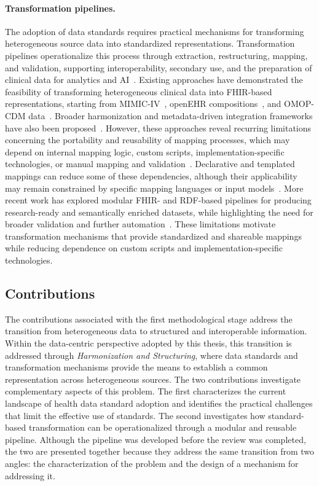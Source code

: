 \paragraph{Transformation pipelines.}
The adoption of data standards requires practical mechanisms for transforming heterogeneous source data into standardized representations. Transformation pipelines operationalize this process through extraction, restructuring, mapping, and validation, supporting interoperability, secondary use, and the preparation of clinical data for analytics and AI~\cite{namli2024scalable,tabari2022state}. Existing approaches have demonstrated the feasibility of transforming heterogeneous clinical data into FHIR-based representations, starting from MIMIC-IV~\cite{bennett2023mimic}, openEHR compositions~\cite{ladas2022openehr}, and OMOP-CDM data~\cite{soares2023omop}. Broader harmonization and metadata-driven integration frameworks have also been proposed~\cite{williams2023standardized,simon2024metadata}. However, these approaches reveal recurring limitations concerning the portability and reusability of mapping processes, which may depend on internal mapping logic, custom scripts, implementation-specific technologies, or manual mapping and validation~\cite{bennett2023mimic,montazeri2023developing,sinaci2023data,williams2023standardized,ladas2022openehr,simon2024metadata}. Declarative and templated mappings can reduce some of these dependencies, although their applicability may remain constrained by specific mapping languages or input models~\cite{sinaci2023data,williams2023standardized,soares2023omop}. More recent work has explored modular FHIR- and RDF-based pipelines for producing research-ready and semantically enriched datasets, while highlighting the need for broader validation and further automation~\cite{carbonaro2025raw}. These limitations motivate transformation mechanisms that provide standardized and shareable mappings while reducing dependence on custom scripts and implementation-specific technologies.

\subsection{Contributions}
\label{subsec:harmonization_contributions}
The contributions associated with the first methodological stage address the transition from heterogeneous data to structured and interoperable information. Within the data-centric perspective adopted by this thesis, this transition is addressed through \emph{Harmonization and Structuring}, where data standards and transformation mechanisms provide the means to establish a common representation across heterogeneous sources. The two contributions investigate complementary aspects of this problem. The first characterizes the current landscape of health data standard adoption and identifies the practical challenges that limit the effective use of standards. The second investigates how standard-based transformation can be operationalized through a modular and reusable pipeline. Although the pipeline was developed before the review was completed, the two are presented together because they address the same transition from two angles: the characterization of the problem and the design of a mechanism for addressing it.


